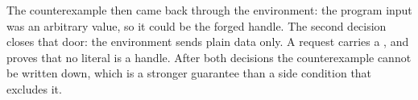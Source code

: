 The counterexample then came back through the environment: the program
input was an arbitrary value, so it could be the forged handle. The second
decision closes that door: the environment sends plain data only. A request
carries a , and  proves that no
literal is a handle. After both decisions the counterexample cannot be
written down, which is a stronger guarantee than a side condition that
excludes it.
